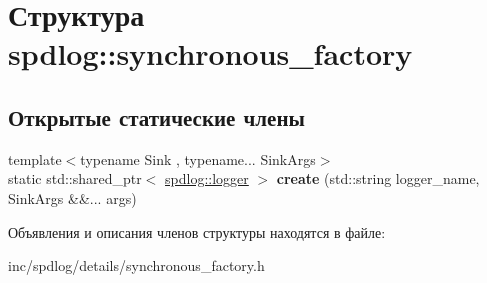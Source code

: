 \hypertarget{structspdlog_1_1synchronous__factory}{}\section{Структура spdlog\+:\+:synchronous\+\_\+factory}
\label{structspdlog_1_1synchronous__factory}
\subsection*{Открытые статические члены}
\begin{DoxyCompactItemize}
\item 
\mbox{\label{structspdlog_1_1synchronous__factory_acde09e4f9f33281ab1e663de5ef703b5}} 
{\footnotesize template$<$typename Sink , typename... Sink\+Args$>$ }\\static std\+::shared\+\_\+ptr$<$ \hyperlink{classspdlog_1_1logger}{spdlog\+::logger} $>$ {\bfseries create} (std\+::string logger\+\_\+name, Sink\+Args \&\&... args)
\end{DoxyCompactItemize}


Объявления и описания членов структуры находятся в файле\+:\begin{DoxyCompactItemize}
\item 
inc/spdlog/details/synchronous\+\_\+factory.\+h\end{DoxyCompactItemize}
